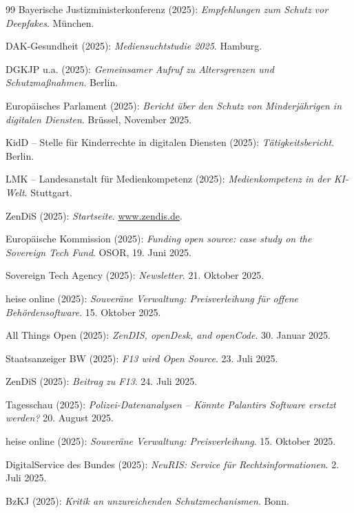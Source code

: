 \documentclass[12pt,a4paper]{article}
\begin{document}
\begin{thebibliography}{99}
		 Bayerische Justizministerkonferenz (2025): \emph{Empfehlungen zum Schutz vor Deepfakes}. München.
		
		 DAK-Gesundheit (2025): \emph{Mediensuchtstudie 2025}. Hamburg.
		
		 DGKJP u.a. (2025): \emph{Gemeinsamer Aufruf zu Altersgrenzen und Schutzmaßnahmen}. Berlin.
		
		 Europäisches Parlament (2025): \emph{Bericht über den Schutz von Minderjährigen in digitalen Diensten}. Brüssel, November 2025.
		
		 KidD – Stelle für Kinderrechte in digitalen Diensten (2025): \emph{Tätigkeitsbericht}. Berlin.
		
		 LMK – Landesanstalt für Medienkompetenz (2025): \emph{Medienkompetenz in der KI-Welt}. Stuttgart.
		
		 ZenDiS (2025): \emph{Startseite}. \url{www.zendis.de}.
		
		 Europäische Kommission (2025): \emph{Funding open source: case study on the Sovereign Tech Fund}. OSOR, 19. Juni 2025.
		
		 Sovereign Tech Agency (2025): \emph{Newsletter}. 21. Oktober 2025.
		
		 heise online (2025): \emph{Souveräne Verwaltung: Preisverleihung für offene Behördensoftware}. 15. Oktober 2025.
		
		 All Things Open (2025): \emph{ZenDIS, openDesk, and openCode}. 30. Januar 2025.
		
		 Staatsanzeiger BW (2025): \emph{F13 wird Open Source}. 23. Juli 2025.
		
		 ZenDiS (2025): \emph{Beitrag zu F13}. 24. Juli 2025.
		
		 Tagesschau (2025): \emph{Polizei-Datenanalysen – Könnte Palantirs Software ersetzt werden?} 20. August 2025.
		
		 heise online (2025): \emph{Souveräne Verwaltung: Preisverleihung}. 15. Oktober 2025.
		
		 DigitalService des Bundes (2025): \emph{NeuRIS: Service für Rechtsinformationen}. 2. Juli 2025.
		
		 BzKJ (2025): \emph{Kritik an unzureichenden Schutzmechanismen}. Bonn.
		
	\end{thebibliography}
	
\end{document}
